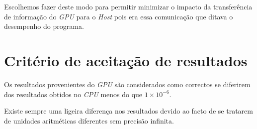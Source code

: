 Escolhemos fazer deste modo para permitir minimizar o impacto da transferência de informação do \textit{GPU} para o \textit{Host} pois era essa comunicação que ditava o desempenho do programa.

\section{Critério de aceitação de resultados}
Os resultados provenientes do \textit{GPU} são considerados como correctos se diferirem dos resultados obtidos no \textit{CPU} menos do que \mbox{$1\times10^{-6}$}.

Existe sempre uma ligeira diferença nos resultados devido ao facto de se tratarem de unidades aritméticas diferentes sem precisão infinita.